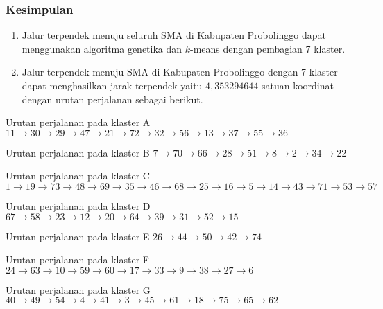 \begin{frame}[allowframebreaks]
\frametitle{Kesimpulan}

\begin{block}{}
\begin{enumerate}
\item Jalur terpendek menuju seluruh SMA di Kabupaten Probolinggo dapat menggunakan algoritma genetika dan $k$-means dengan pembagian 7 klaster.
\item Jalur terpendek menuju SMA di Kabupaten Probolinggo dengan 7 klaster dapat menghasilkan jarak terpendek yaitu $4,353294644$ satuan koordinat dengan urutan perjalanan sebagai berikut.
\end{enumerate}
\end{block}

\begin{block}{Urutan perjalanan pada klaster A}
$11\rightarrow30\rightarrow29\rightarrow47\rightarrow21\rightarrow72\rightarrow32\rightarrow56\rightarrow13\rightarrow37\rightarrow55\rightarrow36$
\end{block}

\begin{block}{Urutan perjalanan pada klaster B}
$7\rightarrow70\rightarrow66\rightarrow28\rightarrow51\rightarrow8\rightarrow2\rightarrow34\rightarrow22$
\end{block}

\begin{block}{Urutan perjalanan pada klaster C}
$1\rightarrow19\rightarrow73\rightarrow48\rightarrow69\rightarrow35\rightarrow46\rightarrow68\rightarrow25\rightarrow16\rightarrow5\rightarrow14\rightarrow43\rightarrow71\rightarrow53\rightarrow57$
\end{block}

\begin{block}{Urutan perjalanan pada klaster D}
$67\rightarrow58\rightarrow23\rightarrow12\rightarrow20\rightarrow64\rightarrow39\rightarrow31\rightarrow52\rightarrow15$
\end{block}

\begin{block}{Urutan perjalanan pada klaster E}
$26\rightarrow44\rightarrow50\rightarrow42\rightarrow74$
\end{block}

\begin{block}{Urutan perjalanan pada klaster F}
$24\rightarrow63\rightarrow10\rightarrow59\rightarrow60\rightarrow17\rightarrow33\rightarrow9\rightarrow38\rightarrow27\rightarrow6$
\end{block}

\begin{block}{Urutan perjalanan pada klaster G}
$40\rightarrow49\rightarrow54\rightarrow4\rightarrow41\rightarrow3\rightarrow45\rightarrow61\rightarrow18\rightarrow75\rightarrow65\rightarrow62$
\end{block}

\end{frame}